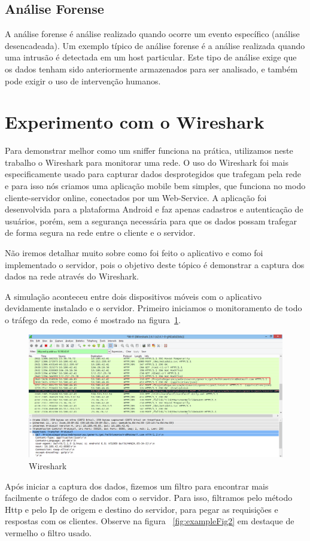 \documentclass[12pt]{article}
\begin{document}
\subsection{Análise Forense}
A análise forense é análise realizado quando ocorre um evento específico (análise desencadeada). Um exemplo típico de análise forense é a análise realizada quando uma intrusão é detectada em um host particular. Este tipo de análise exige que os dados tenham sido anteriormente armazenados para ser analisado, e também pode exigir o uso de intervenção humanos. 

\section{Experimento com o Wireshark}

	Para demonstrar melhor como um sniffer funciona na prática, utilizamos neste trabalho o Wireshark para monitorar uma rede. O uso do Wireshark foi mais especificamente usado para capturar dados desprotegidos que trafegam pela rede e para isso nós criamos uma aplicação mobile bem simples, que funciona no modo cliente-servidor online, conectados por um Web-Service. A aplicação foi desenvolvida para a plataforma Android e faz apenas cadastros e autenticação de usuários, porém, sem a segurança necessária para que os dados possam trafegar de forma segura na rede entre o cliente e o servidor.

	Não iremos detalhar muito sobre como foi feito o aplicativo e como foi implementado o servidor, pois o objetivo deste tópico é demonstrar a captura dos dados na rede através do Wireshark.
    
	A simulação aconteceu entre dois dispositivos móveis com o aplicativo devidamente instalado e o servidor. Primeiro iniciamos o monitoramento de todo o tráfego da rede, como é mostrado na figura~\ref{fig:exampleFig1}. 

\begin{figure}[ht]
\centering
\includegraphics[width=.5\textwidth]{01.png}
\caption{Wireshark}
\label{fig:exampleFig1}
\end{figure}

Após iniciar a captura dos dados, fizemos um filtro para encontrar mais facilmente o tráfego de dados com o servidor. Para isso, filtramos pelo método Http e pelo Ip de origem e destino do servidor, para pegar as requisições e respostas com os clientes. Observe na figura ~\ref{fig:exampleFig2} em destaque de vermelho o filtro usado.
\end{document}
